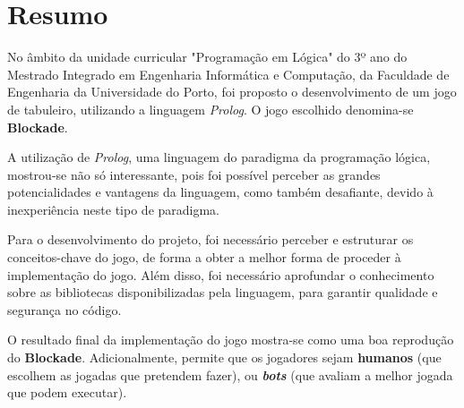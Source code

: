 \documentclass[a4paper]{article}
\begin{document}
\newpage

\section*{Resumo}
No âmbito da unidade curricular "Programação em Lógica" do 3º ano do Mestrado Integrado em Engenharia Informática e Computação, da Faculdade de Engenharia da Universidade do Porto, foi proposto o desenvolvimento de um jogo de tabuleiro, utilizando a linguagem \textit{Prolog}. O jogo  escolhido denomina-se \textbf{Blockade}. \par
A utilização de \textit{Prolog}, uma linguagem do paradigma da programação lógica, mostrou-se não só interessante, pois foi possível perceber as grandes potencialidades e vantagens da linguagem, como também desafiante, devido à inexperiência neste tipo de paradigma. \par
Para o desenvolvimento do projeto, foi necessário perceber e estruturar os conceitos-chave do jogo, de forma a obter a melhor forma de proceder à implementação do jogo. Além disso, foi necessário aprofundar o conhecimento sobre as bibliotecas disponibilizadas pela linguagem, para garantir qualidade e segurança no código. \par
O resultado final da implementação do jogo mostra-se como uma boa reprodução do \textbf{Blockade}. Adicionalmente, permite que os jogadores sejam \textbf{humanos} (que escolhem as jogadas que pretendem fazer), ou \textbf{\textit{bots}} (que avaliam a melhor jogada que podem executar).

\newpage

\tableofcontents



\newpage

\end{document}
